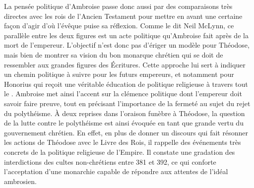 \bigskip

La pensée politique d'Ambroise passe donc aussi par des comparaisons très directes avec les rois de l'Ancien Testament pour mettre en avant une certaine façon d'agir d'où l'évêque puise sa réflexion. Comme le dit Neil McLynn, ce parallèle entre les deux figures est un acte politique qu'Ambroise fait après de la mort de l'empereur. L'objectif n'est donc pas d'ériger un modèle pour Théodose, mais bien de montrer sa vision du bon monarque chrétien qui se doit de ressembler aux grandes figures des Écritures. Cette approche lui sert à indiquer un chemin politique à suivre pour les futurs empereurs, et notamment pour Honorius qui reçoit une véritable éducation de politique religieuse à travers tout le . Ambroise met ainsi l'accent sur la clémence politique dont l'empereur doit savoir faire preuve, tout en précisant l'importance de la fermeté au sujet du rejet du polythéisme\autocite[359-360]{mclynn_ambrose}. À deux reprises dans l'oraison funèbre à Théodose, la question de la lutte contre le polythéisme est ainsi évoquée en tant que grande vertu du gouvernement chrétien. En effet, en plus de donner un discours qui fait résonner les actions de Théodose avec le Livre des Rois, il rappelle des événements très concrets de la politique religieuse de l'Empire. Il constate une gradation des interdictions des cultes non-chrétiens entre 381 et 392, ce qui conforte l'acceptation d'une monarchie capable de répondre aux attentes de l'idéal ambrosien.

\bigskip

